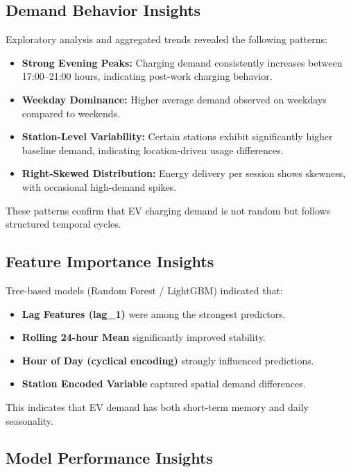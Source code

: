 \documentclass[12pt,a4paper]{article}
\begin{document}
\subsection{Demand Behavior Insights}

Exploratory analysis and aggregated trends revealed the following patterns:

\begin{itemize}
    \item \textbf{Strong Evening Peaks:} Charging demand consistently increases between 17:00–21:00 hours, indicating post-work charging behavior.
    \item \textbf{Weekday Dominance:} Higher average demand observed on weekdays compared to weekends.
    \item \textbf{Station-Level Variability:} Certain stations exhibit significantly higher baseline demand, indicating location-driven usage differences.
    \item \textbf{Right-Skewed Distribution:} Energy delivery per session shows skewness, with occasional high-demand spikes.
\end{itemize}

These patterns confirm that EV charging demand is not random but follows structured temporal cycles.

\subsection{Feature Importance Insights}

Tree-based models (Random Forest / LightGBM) indicated that:

\begin{itemize}
    \item \textbf{Lag Features (lag\_1)} were among the strongest predictors.
    \item \textbf{Rolling 24-hour Mean} significantly improved stability.
    \item \textbf{Hour of Day (cyclical encoding)} strongly influenced predictions.
    \item \textbf{Station Encoded Variable} captured spatial demand differences.
\end{itemize}

This indicates that EV demand has both short-term memory and daily seasonality.

\subsection{Model Performance Insights}
\end{document}
